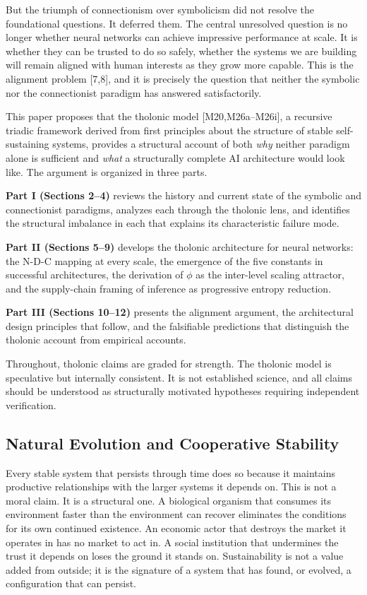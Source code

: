 \documentclass[12pt]{article}
\begin{document}
But the triumph of connectionism over symbolicism did not resolve the
foundational questions. It deferred them. The central unresolved
question is no longer whether neural networks can achieve impressive
performance at scale. It is whether they can be trusted to do so safely,
whether the systems we are building will remain aligned with human
interests as they grow more capable. This is the alignment problem
{[}7,8{]}, and it is precisely the question that neither the symbolic
nor the connectionist paradigm has answered satisfactorily.

This paper proposes that the tholonic model {[}M20,M26a--M26i{]}, a
recursive triadic framework derived from first principles about the
structure of stable self-sustaining systems, provides a structural
account of both \emph{why} neither paradigm alone is sufficient and
\emph{what} a structurally complete AI architecture would look like. The
argument is organized in three parts.

\textbf{Part I (Sections 2--4)} reviews the history and current state of
the symbolic and connectionist paradigms, analyzes each through the
tholonic lens, and identifies the structural imbalance in each that
explains its characteristic failure mode.

\textbf{Part II (Sections 5--9)} develops the tholonic architecture for
neural networks: the N-D-C mapping at every scale, the emergence of the
five constants in successful architectures, the derivation of \(\phi\)
as the inter-level scaling attractor, and the supply-chain framing of
inference as progressive entropy reduction.

\textbf{Part III (Sections 10--12)} presents the alignment argument, the
architectural design principles that follow, and the falsifiable
predictions that distinguish the tholonic account from empirical
accounts.

Throughout, tholonic claims are graded for strength. The tholonic model
is speculative but internally consistent. It is not established science,
and all claims should be understood as structurally motivated hypotheses
requiring independent verification.

\subsection{Natural Evolution and Cooperative Stability}\label{natural-evolution-and-cooperative-stability}

Every stable system that persists through time does so because it
maintains productive relationships with the larger systems it depends
on. This is not a moral claim. It is a structural one. A biological
organism that consumes its environment faster than the environment can
recover eliminates the conditions for its own continued existence. An
economic actor that destroys the market it operates in has no market to
act in. A social institution that undermines the trust it depends on
loses the ground it stands on. Sustainability is not a value added from
outside; it is the signature of a system that has found, or evolved, a
configuration that can persist.
\end{document}
